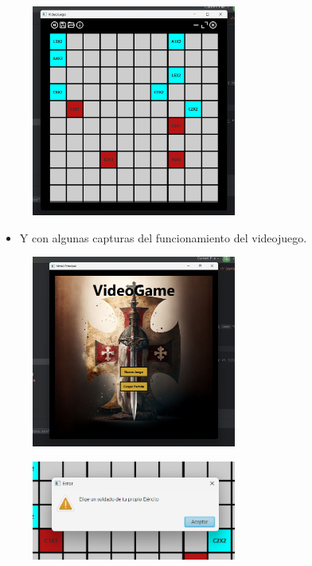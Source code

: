 \documentclass{article}
\begin{document}
	
	\begin{figure}[H]
		\centering
	\includegraphics[width=0.6\textwidth,keepaspectratio]{img/tablero.png}
	\end{figure}
	\begin{itemize}	
		\item Y con algunas capturas del funcionamiento del videojuego.
	\end{itemize}
	\begin{figure}[H]
		\centering
	\includegraphics[width=0.6\textwidth,keepaspectratio]{img/principal.png}
	\end{figure}
	\begin{figure}[H]
		\centering
	\includegraphics[width=0.6\textwidth,keepaspectratio]{img/eleccion.png}
	\end{figure}
	
\end{document}
